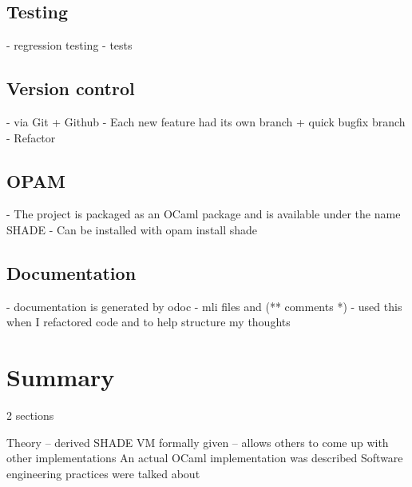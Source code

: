 \documentclass[class=article, crop=false]{standalone}
\begin{document}
\subsection{Testing}
- regression testing
- tests

\subsection{Version control}
- via Git + Github
- Each new feature had its own branch + quick bugfix branch
- Refactor

\subsection{OPAM}
- The project is packaged as an OCaml package and is available under the name SHADE
- Can be installed with opam install shade

\subsection{Documentation}
- documentation is generated by odoc
- mli files and (** comments *)
- used this when I refactored code and to help structure my thoughts

\section{Summary}

2 sections

Theory -- derived
SHADE VM formally given -- allows others to come up with other implementations
An actual OCaml implementation was described
Software engineering practices were talked about
\end{document}
